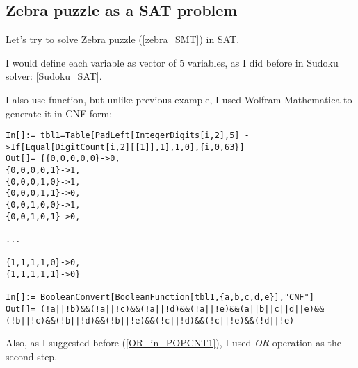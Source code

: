 \subsection{Zebra puzzle as a SAT problem}
\label{Zebra_SAT}

Let's try to solve Zebra puzzle (\ref{zebra_SMT}) in SAT.

I would define each variable as vector of 5 variables, as I did before in Sudoku solver: \ref{Sudoku_SAT}.

I also use  function, but unlike previous example, I used Wolfram Mathematica to generate it in CNF form:

\begin{lstlisting}
In[]:= tbl1=Table[PadLeft[IntegerDigits[i,2],5] ->If[Equal[DigitCount[i,2][[1]],1],1,0],{i,0,63}]
Out[]= {{0,0,0,0,0}->0,
{0,0,0,0,1}->1,
{0,0,0,1,0}->1,
{0,0,0,1,1}->0,
{0,0,1,0,0}->1,
{0,0,1,0,1}->0,

...

{1,1,1,1,0}->0,
{1,1,1,1,1}->0}

In[]:= BooleanConvert[BooleanFunction[tbl1,{a,b,c,d,e}],"CNF"]
Out[]= (!a||!b)&&(!a||!c)&&(!a||!d)&&(!a||!e)&&(a||b||c||d||e)&&(!b||!c)&&(!b||!d)&&(!b||!e)&&(!c||!d)&&(!c||!e)&&(!d||!e)
\end{lstlisting}

Also, as I suggested before (\ref{OR_in_POPCNT1}), I used \textit{OR} operation as the second step.

